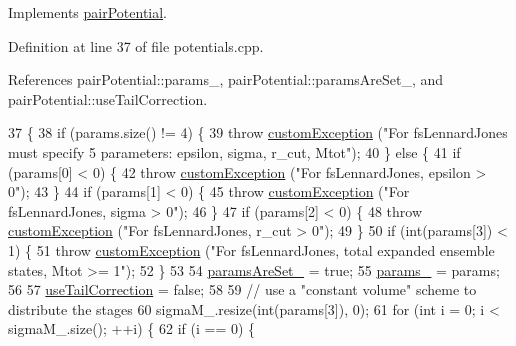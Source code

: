 Implements \hyperlink{classpair_potential_ad4b237646f9de2ae9f95cc9350564bc5}{pair\-Potential}.



Definition at line 37 of file potentials.\-cpp.



References pair\-Potential\-::params\-\_\-, pair\-Potential\-::params\-Are\-Set\-\_\-, and pair\-Potential\-::use\-Tail\-Correction.


\begin{DoxyCode}
37                                                                      \{
38     \textcolor{keywordflow}{if} (params.size() != 4) \{
39         \textcolor{keywordflow}{throw} \hyperlink{classcustom_exception}{customException} (\textcolor{stringliteral}{"For fsLennardJones must specify 5 parameters: epsilon,
       sigma, r\_cut, Mtot"});
40     \} \textcolor{keywordflow}{else} \{
41         \textcolor{keywordflow}{if} (params[0] < 0) \{
42             \textcolor{keywordflow}{throw} \hyperlink{classcustom_exception}{customException} (\textcolor{stringliteral}{"For fsLennardJones, epsilon > 0"});
43         \}
44         \textcolor{keywordflow}{if} (params[1] < 0) \{
45             \textcolor{keywordflow}{throw} \hyperlink{classcustom_exception}{customException} (\textcolor{stringliteral}{"For fsLennardJones, sigma > 0"});
46         \}
47         \textcolor{keywordflow}{if} (params[2] < 0) \{
48             \textcolor{keywordflow}{throw} \hyperlink{classcustom_exception}{customException} (\textcolor{stringliteral}{"For fsLennardJones, r\_cut > 0"});
49         \}
50         \textcolor{keywordflow}{if} (\textcolor{keywordtype}{int}(params[3]) < 1) \{
51             \textcolor{keywordflow}{throw} \hyperlink{classcustom_exception}{customException} (\textcolor{stringliteral}{"For fsLennardJones, total expanded ensemble states, Mtot
       >= 1"});
52         \}
53 
54         \hyperlink{classpair_potential_a635755c0a952bfc05a4cfae230c3dbd2}{paramsAreSet\_} = \textcolor{keyword}{true};
55         \hyperlink{classpair_potential_abf8ec8af983d6e9960bd149da099e883}{params\_} = params;
56 
57         \hyperlink{classpair_potential_ab4b4538a7e13771f50a29aaac2443037}{useTailCorrection} = \textcolor{keyword}{false};
58 
59         \textcolor{comment}{// use a "constant volume" scheme to distribute the stages}
60         sigmaM\_.resize(\textcolor{keywordtype}{int}(params[3]), 0);
61         \textcolor{keywordflow}{for} (\textcolor{keywordtype}{int} i = 0; i < sigmaM\_.size(); ++i) \{
62             \textcolor{keywordflow}{if} (i == 0) \{

\end{DoxyCode}
